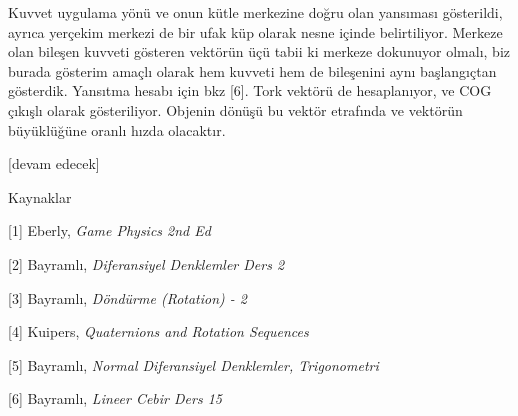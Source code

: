 \documentclass[12pt,fleqn]{article}\usepackage{../../common}
\begin{document}
Kuvvet uygulama yönü ve onun kütle merkezine doğru olan yansıması gösterildi,
ayrıca yerçekim merkezi de bir ufak küp olarak nesne içinde belirtiliyor.
Merkeze olan bileşen kuvveti gösteren vektörün üçü tabii ki merkeze dokunuyor
olmalı, biz burada gösterim amaçlı olarak hem kuvveti hem de bileşenini aynı
başlangıçtan gösterdik. Yansıtma hesabı için bkz [6]. Tork vektörü de
hesaplanıyor, ve COG çıkışlı olarak gösteriliyor. Objenin dönüşü bu vektör
etrafında ve vektörün büyüklüğüne oranlı hızda olacaktır.


[devam edecek]

Kaynaklar

[1] Eberly, {\em Game Physics 2nd Ed}

[2] Bayramlı, {\em Diferansiyel Denklemler Ders 2}

[3] Bayramlı, {\em Döndürme (Rotation) - 2}

[4] Kuipers, {\em Quaternions and Rotation Sequences}

[5] Bayramlı, {\em Normal Diferansiyel Denklemler, Trigonometri}

[6] Bayramlı, {\em Lineer Cebir Ders 15}
\end{document}
